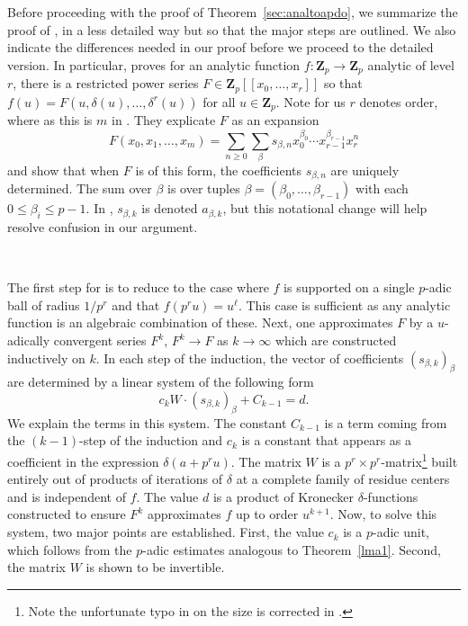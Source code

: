 \documentclass[10pt]{amsart}
\theoremstyle{Theorem}
\theoremstyle{definition}
\newcommand{\ZZ}{\mathbf Z}
\renewcommand{\d}{\delta}
\def\cs{s}
\begin{document}
Before proceeding with the proof of Theorem~\ref{sec:analtoapdo}, we summarize the proof of \cite[Thm. 5]{BRS11}, in a less detailed way but so that the major steps are outlined. We also indicate the differences needed in our proof before we proceed to the detailed version. In particular, \cite[Thm. 5]{BRS11} proves for an analytic function $f \colon \ZZ_p \to \ZZ_p$ analytic of level $r$, there is a restricted power series $F \in \ZZ_p[[x_0,\ldots,x_r]]$ so that $f(u) = F(u,\d(u),\ldots,\d^r(u))$ for all $u \in \ZZ_p$. Note for us $r$ denotes order, where as this is $m$ in \cite{BRS11}. They explicate $F$ as an expansion $$F(x_0,x_1,\ldots,x_m) = \sum_{n \geq 0} \sum_\beta \cs_{\beta,n} x_0^{\beta_0}\cdots x_{r-1}^{\beta_{r-1}} x_r^n$$ and show that when $F$ is of this form, the coefficients $\cs_{\beta,n}$ are uniquely determined. The sum over $\beta$ is over tuples $\beta = (\beta_0,\ldots,\beta_{r-1})$ with each $0 \leq \beta_i \leq p-1$. In \cite{BRS11}, $\cs_{\beta,k}$ is denoted $a_{\beta,k}$, but this notational change will help resolve confusion in our argument.

\

The first step for \cite[Thm. 5]{BRS11} is to reduce to the case where $f$ is supported on a single $p$-adic ball of radius $1/p^r$ and that $f(p^r u) = u^\ell$. This case is sufficient as any analytic function is an algebraic combination of these. Next, one approximates $F$ by a $u$-adically convergent series $F^k$, $F^k \to F$ as $k \to \infty$ which are constructed inductively on $k$. In each step of the induction, the vector of coefficients $(\cs_{\beta,k})_{\beta}$ are determined by a linear system of the following form 
\begin{equation}\label{eq:infinitywars}
c_k W \cdot (\cs_{\beta,k})_{\beta} + C_{k-1} = d.
\end{equation} We explain the terms in this system. The constant $C_{k-1}$ is a term coming from the $(k-1)$-step of the induction and $c_k$ is a constant that appears as a coefficient in the expression $\d(a + p^r u)$. The matrix $W$ is a $p^r \times p^r$-matrix\footnote{Note the unfortunate typo in \cite{BRS11} on the size is corrected in \cite{Bra20}.} built entirely out of products of iterations of $\d$ at a complete family of residue centers and is independent of $f$. The value $d$ is a product of  Kronecker $\d$-functions constructed to ensure $F^k$ approximates $f$ up to order $u^{k+1}$. Now, to solve this system, two major points are established. First, the value $c_k$ is a $p$-adic unit, which follows from the $p$-adic estimates analogous to Theorem~\ref{lma1}. Second, the matrix $W$ is shown to be invertible. 
\end{document}

